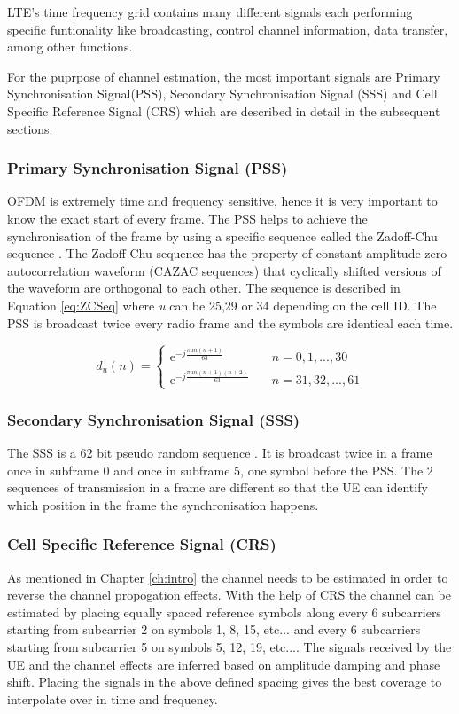 LTE's time frequency grid contains many different signals each performing specific funtionality like broadcasting, control channel information, data transfer, among other functions.

For the puprpose of channel estmation, the most important signals are Primary Synchronisation Signal(PSS), Secondary Synchronisation Signal (SSS) and Cell Specific Reference Signal (CRS) which are described in detail in the subsequent sections.

\subsubsection {Primary Synchronisation Signal (PSS)}
        OFDM is extremely time and frequency sensitive, hence it is very important to know the exact start of every frame. The PSS helps to achieve the synchronisation of the frame by using a specific sequence called the Zadoff-Chu sequence \cite{3gpp36211}.
        The Zadoff-Chu sequence has the property of constant amplitude zero autocorrelation waveform (CAZAC sequences) that cyclically shifted versions of the waveform are orthogonal to each other. The sequence is described in Equation \ref{eq:ZCSeq} where {\em u}  can be 25,29 or 34 depending on the cell ID.
        The PSS is broadcast twice every radio frame and the symbols are identical each time.

\begin{equation} \label{eq:ZCSeq}
        d_u(n) =
        \begin{cases}
            \mathrm{e}^{-j\frac{\pi un(n+1)}{63}}       & \quad n=0,1,...,30\\
            \mathrm{e}^{-j\frac{\pi un(n+1)(n+2)}{63}} & \quad n=31,32,...,61
        \end{cases}
\end{equation}

\subsubsection{Secondary Synchronisation Signal (SSS)}
        The SSS is a 62 bit pseudo random sequence \cite{3gpp36211}. It is broadcast twice in a frame once in subframe 0 and once in subframe 5, one symbol before the PSS. The 2 sequences of transmission in a frame are different so that the UE can identify which position in the frame the synchronisation happens.

\subsubsection{Cell Specific Reference Signal (CRS)}
        As mentioned in Chapter \ref{ch:intro} the channel needs to be estimated in order to reverse the channel propogation effects. With the help of CRS the channel can be estimated by placing equally spaced reference symbols along every 6 subcarriers starting from subcarrier 2 on symbols 1, 8, 15, etc... and every 6 subcarriers starting from subcarrier 5 on symbols 5, 12, 19, etc...\cite{3gpp36211}. The signals received by the UE and the channel effects are inferred based on amplitude damping and phase shift. Placing the signals in the above defined spacing gives the best coverage to interpolate over in time and frequency.


